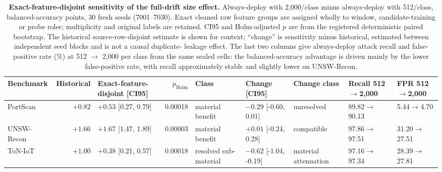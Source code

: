 \begin{table}[t]
\centering
\caption{\textbf{Exact-feature-disjoint sensitivity of the full-drift size effect.}
Always-deploy with 2{,}000/class minus always-deploy with 512/class, balanced-accuracy
points, 30 fresh seeds (7001--7030). Exact cleaned raw feature groups are assigned wholly
to window, candidate-training or probe roles; multiplicity and original labels are retained.
CI95 and Holm-adjusted $p$ are from the registered deterministic paired bootstrap. The
historical source-row-disjoint estimate is shown for context; ``change'' is sensitivity
minus historical, estimated between independent seed blocks and is not a causal duplicate-
leakage effect. The last two columns give always-deploy attack recall and false-positive
rate (\%) at 512 $\to$ 2{,}000 per class from the same sealed cells: the balanced-accuracy
advantage is driven mainly by the lower false-positive rate, with recall approximately
stable and slightly lower on UNSW-Recon.}
\label{tab:value_disjoint_main}
\scriptsize
\setlength{\tabcolsep}{2.5pt}
\begin{tabular}{l r l r l l l l l}
\toprule
Benchmark & Historical & Exact-feature-disjoint [CI95] & $p_{\mathrm{Holm}}$ & Class & Change [CI95] & Change class & Recall 512$\to$2{,}000 & FPR 512$\to$2{,}000 \\
\midrule
PortScan & $+0.82$ & $+0.53$ [0.27, 0.79] & 0.00018 & material benefit & $-0.29$ [-0.60, 0.01] & unresolved & 89.82$\to$90.13 & 5.44$\to$4.70 \\
UNSW-Recon & $+1.66$ & $+1.67$ [1.47, 1.89] & 0.00003 & material benefit & $+0.01$ [-0.24, 0.28] & compatible & 97.86$\to$97.51 & 31.20$\to$27.51 \\
ToN-IoT & $+1.00$ & $+0.38$ [0.21, 0.57] & 0.00018 & resolved sub-material & $-0.62$ [-1.04, -0.19] & material attenuation & 97.16$\to$97.34 & 28.39$\to$27.81 \\
\bottomrule
\end{tabular}
\end{table}
